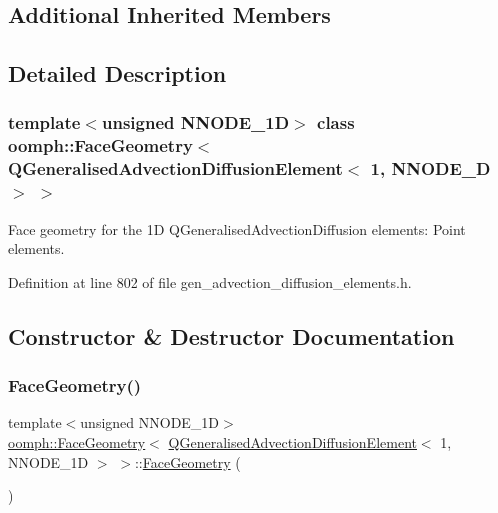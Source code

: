\subsection*{Additional Inherited Members}


\subsection{Detailed Description}
\subsubsection*{template$<$unsigned N\+N\+O\+D\+E\+\_\+1D$>$\newline
class oomph\+::\+Face\+Geometry$<$ Q\+Generalised\+Advection\+Diffusion\+Element$<$ 1, N\+N\+O\+D\+E\+\_\+D $>$ $>$}

Face geometry for the 1D Q\+Generalised\+Advection\+Diffusion elements\+: Point elements. 

Definition at line 802 of file gen\+\_\+advection\+\_\+diffusion\+\_\+elements.\+h.



\subsection{Constructor \& Destructor Documentation}
\mbox{\label{classoomph_1_1FaceGeometry_3_01QGeneralisedAdvectionDiffusionElement_3_011_00_01NNODE__1D_01_4_01_4_afea1308a286ac676d6f8dd20329b7603}} 
\subsubsection{\texorpdfstring{Face\+Geometry()}{FaceGeometry()}}
{\footnotesize\ttfamily template$<$unsigned N\+N\+O\+D\+E\+\_\+1D$>$ \\
\hyperlink{classoomph_1_1FaceGeometry}{oomph\+::\+Face\+Geometry}$<$ \hyperlink{classoomph_1_1QGeneralisedAdvectionDiffusionElement}{Q\+Generalised\+Advection\+Diffusion\+Element}$<$ 1, N\+N\+O\+D\+E\+\_\+1D $>$ $>$\+::\hyperlink{classoomph_1_1FaceGeometry}{Face\+Geometry} (\begin{DoxyParamCaption}{ }\end{DoxyParamCaption})\hspace{0.3cm}{\ttfamily [inline]}}



